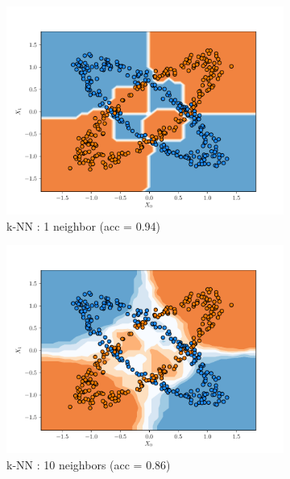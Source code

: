 \begin{figure}[H]
    \centering
    \begin{subfigure}{0.495\textwidth}
        \includegraphics[width=\textwidth]{resources/pdf/make_data2_knn_1.pdf}
        \caption{k-NN : 1 neighbor (acc = \num{0.94})}
    \end{subfigure}
    \begin{subfigure}{0.495\textwidth}
        \includegraphics[width=\textwidth]{resources/pdf/make_data2_knn_10.pdf}
        \caption{k-NN : 10 neighbors (acc = \num{0.86})}
    \end{subfigure}
    \vspace{3pt}
    \begin{subfigure}{0.495\textwidth}

\end{subfigure}
\end{figure}
